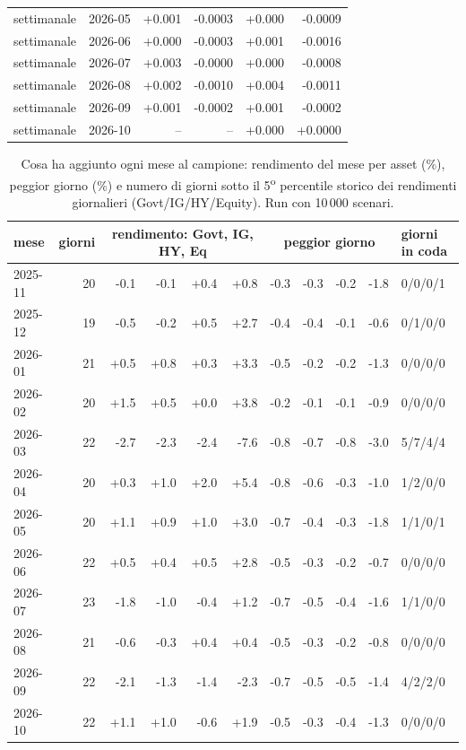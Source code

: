 \begin{table}[htbp]
\begin{tabular}{llrrrr}
settimanale & 2026-05 & +0.001 & -0.0003 & +0.000 & -0.0009 \\
settimanale & 2026-06 & +0.000 & -0.0003 & +0.001 & -0.0016 \\
settimanale & 2026-07 & +0.003 & -0.0000 & +0.000 & -0.0008 \\
settimanale & 2026-08 & +0.002 & -0.0010 & +0.004 & -0.0011 \\
settimanale & 2026-09 & +0.001 & -0.0002 & +0.001 & -0.0002 \\
settimanale & 2026-10 & -- & -- & +0.000 & +0.0000 \\
\bottomrule\end{tabular}\end{table}

\begin{table}[htbp]\centering\scriptsize\setlength{\tabcolsep}{3.5pt}
\caption{Cosa ha aggiunto ogni mese al campione: rendimento del mese per asset (\%), peggior giorno (\%) e numero di giorni sotto il 5\textsuperscript{o} percentile storico dei rendimenti giornalieri (Govt/IG/HY/Equity). Run con 10\,000 scenari.}\label{tab:added_10k}
\begin{tabular}{lrrrrrrrrrl}\toprule
mese & giorni & \multicolumn{4}{c}{rendimento: Govt, IG, HY, Eq} & \multicolumn{4}{c}{peggior giorno} & giorni in coda \\\midrule
2025-11 & 20 & -0.1 & -0.1 & +0.4 & +0.8 & -0.3 & -0.3 & -0.2 & -1.8 & 0/0/0/1 \\
2025-12 & 19 & -0.5 & -0.2 & +0.5 & +2.7 & -0.4 & -0.4 & -0.1 & -0.6 & 0/1/0/0 \\
2026-01 & 21 & +0.5 & +0.8 & +0.3 & +3.3 & -0.5 & -0.2 & -0.2 & -1.3 & 0/0/0/0 \\
2026-02 & 20 & +1.5 & +0.5 & +0.0 & +3.8 & -0.2 & -0.1 & -0.1 & -0.9 & 0/0/0/0 \\
2026-03 & 22 & -2.7 & -2.3 & -2.4 & -7.6 & -0.8 & -0.7 & -0.8 & -3.0 & 5/7/4/4 \\
2026-04 & 20 & +0.3 & +1.0 & +2.0 & +5.4 & -0.8 & -0.6 & -0.3 & -1.0 & 1/2/0/0 \\
2026-05 & 20 & +1.1 & +0.9 & +1.0 & +3.0 & -0.7 & -0.4 & -0.3 & -1.8 & 1/1/0/1 \\
2026-06 & 22 & +0.5 & +0.4 & +0.5 & +2.8 & -0.5 & -0.3 & -0.2 & -0.7 & 0/0/0/0 \\
2026-07 & 23 & -1.8 & -1.0 & -0.4 & +1.2 & -0.7 & -0.5 & -0.4 & -1.6 & 1/1/0/0 \\
2026-08 & 21 & -0.6 & -0.3 & +0.4 & +0.4 & -0.5 & -0.3 & -0.2 & -0.8 & 0/0/0/0 \\
2026-09 & 22 & -2.1 & -1.3 & -1.4 & -2.3 & -0.7 & -0.5 & -0.5 & -1.4 & 4/2/2/0 \\
2026-10 & 22 & +1.1 & +1.0 & -0.6 & +1.9 & -0.5 & -0.3 & -0.4 & -1.3 & 0/0/0/0 \\
\bottomrule\end{tabular}\end{table}

